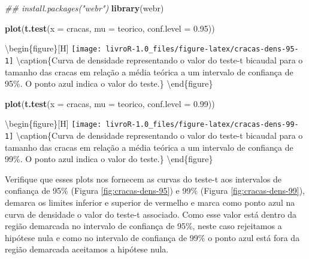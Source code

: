 \documentclass[14pt,titlepage, oneside, openany, a4paper]{book}
\newenvironment{Shaded}{\begin{snugshade}}{\end{snugshade}}
\newcommand{\CommentTok}[1]{\textcolor[rgb]{0.56,0.35,0.01}{\textit{#1}}}
\newcommand{\DataTypeTok}[1]{\textcolor[rgb]{0.13,0.29,0.53}{#1}}
\newcommand{\FloatTok}[1]{\textcolor[rgb]{0.00,0.00,0.81}{#1}}
\newcommand{\KeywordTok}[1]{\textcolor[rgb]{0.13,0.29,0.53}{\textbf{#1}}}
\newcommand{\NormalTok}[1]{#1}
\begin{document}
\begin{Shaded}
\begin{Highlighting}[]
\CommentTok{## install.packages("webr")}
\KeywordTok{library}\NormalTok{(webr)}
\end{Highlighting}
\end{Shaded}

\begin{Shaded}
\begin{Highlighting}[]
\KeywordTok{plot}\NormalTok{(}\KeywordTok{t.test}\NormalTok{(}\DataTypeTok{x =}\NormalTok{ cracas, }\DataTypeTok{mu =}\NormalTok{ teorico, }\DataTypeTok{conf.level =} \FloatTok{0.95}\NormalTok{))}
\end{Highlighting}
\end{Shaded}

\textbackslash{}begin\{figure\}{[}H{]}
\texttt{[image: livroR-1.0\_files/figure-latex/cracas-dens-95-1]} \textbackslash{}caption\{Curva de densidade representando o valor do teste-t bicaudal para o tamanho das cracas em relação a média teórica a um intervalo de confiança de 95\%. O ponto azul indica o valor do teste.\}\label{fig:cracas-dens-95}
\textbackslash{}end\{figure\}

\begin{Shaded}
\begin{Highlighting}[]
\KeywordTok{plot}\NormalTok{(}\KeywordTok{t.test}\NormalTok{(}\DataTypeTok{x =}\NormalTok{ cracas, }\DataTypeTok{mu =}\NormalTok{ teorico, }\DataTypeTok{conf.level =} \FloatTok{0.99}\NormalTok{))}
\end{Highlighting}
\end{Shaded}

\textbackslash{}begin\{figure\}{[}H{]}
\texttt{[image: livroR-1.0\_files/figure-latex/cracas-dens-99-1]} \textbackslash{}caption\{Curva de densidade representando o valor do teste-t bicaudal para o tamanho das cracas em relação a média teórica a um intervalo de confiança de 99\%. O ponto azul indica o valor do teste.\}\label{fig:cracas-dens-99}
\textbackslash{}end\{figure\}

Verifique que esses plots nos fornecem as curvas do teste-t aos intervalos de confiança de 95\% (Figura \ref{fig:cracas-dens-95}) e 99\% (Figura \ref{fig:cracas-dens-99}), demarca os limites inferior e superior de vermelho e marca como ponto azul na curva de densidade o valor do teste-t associado. Como esse valor está dentro da região demarcada no intervalo de confiança de 95\%, neste caso rejeitamos a hipótese nula e como no intervalo de confiança de 99\% o ponto azul está fora da região demarcada aceitamos a hipótese nula.
\end{document}

